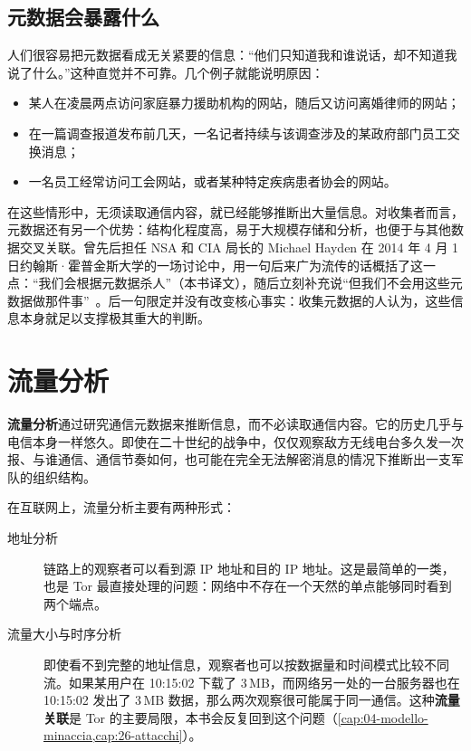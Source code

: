 \subsection{元数据会暴露什么}

人们很容易把元数据看成无关紧要的信息：\enquote{他们只知道我和谁说话，却不知道我说了什么。}这种直觉并不可靠。几个例子就能说明原因：
\begin{itemize}
  \item 某人在凌晨两点访问家庭暴力援助机构的网站，随后又访问离婚律师的网站；
  \item 在一篇调查报道发布前几天，一名记者持续与该调查涉及的某政府部门员工交换消息；
  \item 一名员工经常访问工会网站，或者某种特定疾病患者协会的网站。
\end{itemize}
在这些情形中，无须读取通信内容，就已经能够推断出大量信息。对收集者而言，元数据还有另一个优势：结构化程度高，易于大规模存储和分析，也便于与其他数据交叉关联。曾先后担任 NSA 和 CIA 局长的 Michael Hayden 在 2014 年 4 月 1 日约翰斯·霍普金斯大学的一场讨论中，用一句后来广为流传的话概括了这一点：\enquote{我们会根据元数据杀人}（本书译文），随后立刻补充说\enquote{但我们不会用这些元数据做那件事}~\cite{hayden2014metadata}。后一句限定并没有改变核心事实：收集元数据的人认为，这些信息本身就足以支撑极其重大的判断。

\section{流量分析}\label{sec:anon-traffico}

\textbf{流量分析}通过研究通信元数据来推断信息，而不必读取通信内容。它的历史几乎与电信本身一样悠久。即使在二十世纪的战争中，仅仅观察敌方无线电台多久发一次报、与谁通信、通信节奏如何，也可能在完全无法解密消息的情况下推断出一支军队的组织结构。

在互联网上，流量分析主要有两种形式：
\begin{description}
  \item[地址分析] 链路上的观察者可以看到源 IP 地址和目的 IP 地址。这是最简单的一类，也是 Tor 最直接处理的问题：网络中不存在一个天然的单点能够同时看到两个端点。
  \item[流量大小与时序分析] 即使看不到完整的地址信息，观察者也可以按数据量和时间模式比较不同流。如果某用户在 10:15:02 下载了 3\,MB，而网络另一处的一台服务器也在 10:15:02 发出了 3\,MB 数据，那么两次观察很可能属于同一通信。这种\textbf{流量关联}是 Tor 的主要局限，本书会反复回到这个问题（\cref{cap:04-modello-minaccia,cap:26-attacchi}）。
\end{description}

